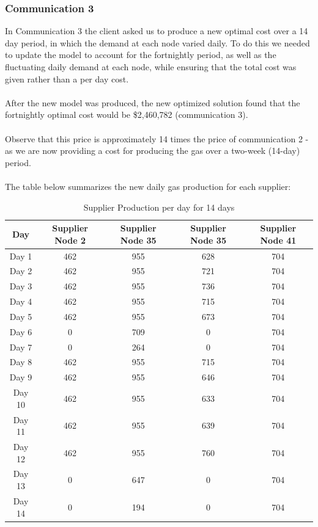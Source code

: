 \documentclass{article}
\begin{document}
\subsubsection{Communication 3}
In Communication 3 the client asked us to produce a new optimal cost over a 14 day period, in which the demand at each node varied daily. To do this we needed to update the model to account for the fortnightly period, as well as the fluctuating daily demand at each node, while ensuring that the total cost was given rather than a per day cost. \\
\\
After the new model was produced, the new optimized solution found that the fortnightly optimal cost would be \$2,460,782 (communication 3). \\
\\
Observe that this price is approximately 14 times the price of communication 2 - as we are now providing a cost for producing the gas over a two-week (14-day) period.\\
\\
The table below summarizes the new daily gas production for each supplier: 
\renewcommand\baselinestretch{1.5}
\begin{table}[h]
    \centering
    \color{black}
    \begin{tabular}{|c:c:c:c:c|}
        \hline
        \textbf{Day} & \textbf{Supplier Node 2} & \textbf{Supplier Node 35} & \textbf{Supplier Node 35} & \textbf{Supplier Node 41} \\ \hline
        Day 1 & 462 & 955 & 628 & 704 \\ \hdashline
        Day 2 & 462 & 955 & 721 & 704 \\ \hdashline
        Day 3 & 462 & 955 & 736 & 704 \\ \hdashline
        Day 4 & 462 & 955 & 715 & 704 \\ \hdashline
        Day 5 & 462 & 955 & 673 & 704 \\ \hdashline
        Day 6 & 0 & 709 & 0 &704 \\ \hdashline
        Day 7 & 0 & 264 & 0 & 704 \\ \hdashline
        Day 8 & 462 & 955 & 715 & 704 \\ \hdashline
        Day 9 & 462 & 955 & 646 & 704 \\ \hdashline
        Day 10 & 462 & 955 & 633 & 704 \\ \hdashline
        Day 11 & 462 & 955 & 639 & 704 \\ \hdashline
        Day 12 & 462 & 955 & 760 & 704 \\ \hdashline
        Day 13 & 0 & 647 & 0 &  704 \\ \hdashline
        Day 14 & 0 & 194 & 0 & 704 \\ \hline
    \end{tabular}
    \caption{Supplier Production per day for 14 days}
    \label{tab:supinfo2}
\end{table}
\renewcommand\baselinestretch{1}
\newpage
\bigskip
\end{document}
